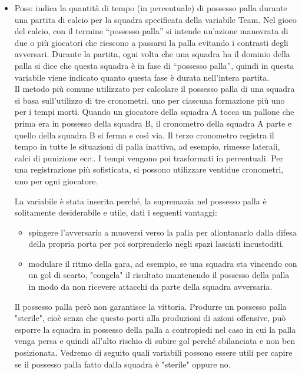\begin{itemize}
	
	\item \textsf{Poss}: indica la quantità di tempo (in percentuale) di possesso palla durante una partita di calcio per la squadra specificata della variabile \textsf{Team}. Nel gioco del calcio, con il termine “possesso palla” si intende un’azione manovrata di due o più giocatori che riescono a passarsi la palla evitando i contrasti degli avversari. Durante la partita, ogni volta che una squadra ha il dominio della palla si dice che questa squadra è in fase di “possesso palla”, quindi in questa variabile viene indicato quanto questa fase è durata nell'intera partita.\\
	Il metodo più comune utilizzato per calcolare il possesso palla di una squadra si basa sull'utilizzo di tre cronometri, uno per ciascuna formazione più uno per i tempi morti. Quando un giocatore della squadra A tocca un pallone che prima era in possesso della squadra B, il cronometro della squadra A parte e quello della squadra B si ferma e così via. Il terzo cronometro registra il tempo in tutte le situazioni di palla inattiva, ad esempio, rimesse laterali, calci di punizione ecc.. I tempi vengono poi trasformati in percentuali. Per una registrazione più sofisticata, si possono utilizzare ventidue cronometri, uno per ogni giocatore.
	
	La variabile è stata inserita perché, la supremazia nel possesso palla è solitamente desiderabile e utile, dati i seguenti vantaggi:
	\begin{itemize}
		\item spingere l’avversario a muoversi verso la palla per allontanarlo dalla difesa della propria porta per poi sorprenderlo negli spazi lasciati incustoditi.   
		\item modulare il ritmo della gara, ad esempio, se una squadra sta vincendo con un gol di scarto, "congela" il risultato mantenendo il possesso della palla in modo da non ricevere attacchi da parte della squadra avversaria.
	\end{itemize}
	Il possesso palla però non garantisce la vittoria. Produrre un possesso palla "sterile", cioè senza che questo porti alla produzioni di azioni offensive, può esporre la squadra in possesso della palla a contropiedi nel caso in cui la palla venga persa e quindi all'alto rischio di subire gol perché sbilanciata e non ben posizionata. Vedremo di seguito quali variabili possono essere utili per capire se il possesso palla fatto dalla squadra è "sterile" oppure no.


\end{itemize}
